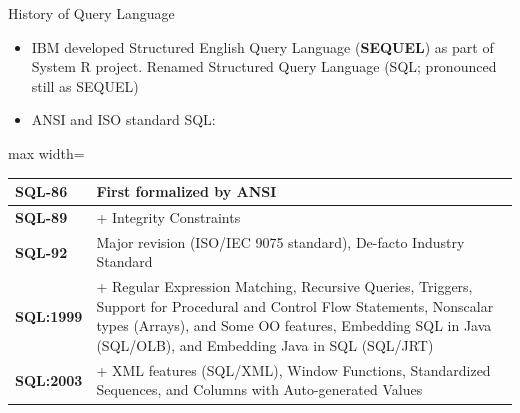 \documentclass[aspectratio=169, xcolor=dvipsnames]{beamer}
\begin{document}
\begin{frame}{History of Query Language}
    \begin{itemize}[<+->]
        \item IBM developed Structured English Query Language (\textbf{SEQUEL}) as part of System R project. Renamed Structured Query Language (SQL; pronounced still as SEQUEL)
        \item ANSI and ISO standard SQL:
    \end{itemize}
    \vspace{0.5em}
    \begin{center}
        \begin{adjustbox}{max width=\textwidth}
        \begin{tabular}{|l|p{12cm}|}
        \hline
        \textbf{SQL-86} & First formalized by ANSI \\ \hline
        \textbf{SQL-89} & + Integrity Constraints \\ \hline
        \textbf{SQL-92} & Major revision (ISO/IEC 9075 standard), De-facto Industry Standard \\ \hline
        \textbf{SQL:1999} & + Regular Expression Matching, Recursive Queries, Triggers, Support for Procedural and Control Flow Statements, Nonscalar types (Arrays), and Some OO features, Embedding SQL in Java (SQL/OLB), and Embedding Java in SQL (SQL/JRT) \\ \hline
        \textbf{SQL:2003} & + XML features (SQL/XML), Window Functions, Standardized Sequences, and Columns with Auto-generated Values \\ \hline
        \end{tabular}
        \end{adjustbox}
    \end{center}
\end{frame}
\end{document}
